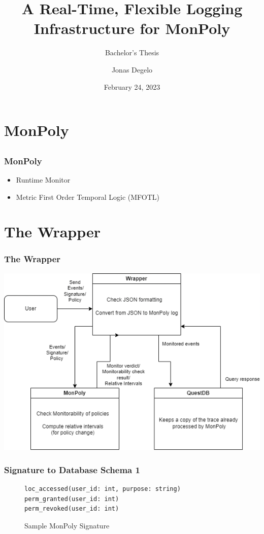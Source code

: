 \documentclass{beamer}
\title{A Real-Time, Flexible Logging Infrastructure for MonPoly}
\subtitle{Bachelor's Thesis}
\author{Jonas Degelo}
\institute{ETH Zürich}
\date{February 24, 2023}
\begin{document}
\begin{frame}
\titlepage
\end{frame}

\section{MonPoly}
\subsection{}

\begin{frame}
    \frametitle{MonPoly}
    \begin{itemize}
        \item Runtime Monitor
        \item Metric First Order Temporal Logic (MFOTL)
    \end{itemize}
    
\end{frame}


\section{The Wrapper}

\begin{frame}
    \frametitle{The Wrapper}
    \centering
    \includegraphics[width=0.9\linewidth]{diagrams/wrapper.png}
\end{frame}

\begin{frame}[fragile]
    \frametitle{Signature to Database Schema 1}

\begin{figure}[H]
    \label{fig:example-signature}
\begin{verbatim}
loc_accessed(user_id: int, purpose: string)
perm_granted(user_id: int)
perm_revoked(user_id: int)
\end{verbatim}
    \caption{Sample MonPoly Signature}
\end{figure}
    
\end{frame}
\end{document}

